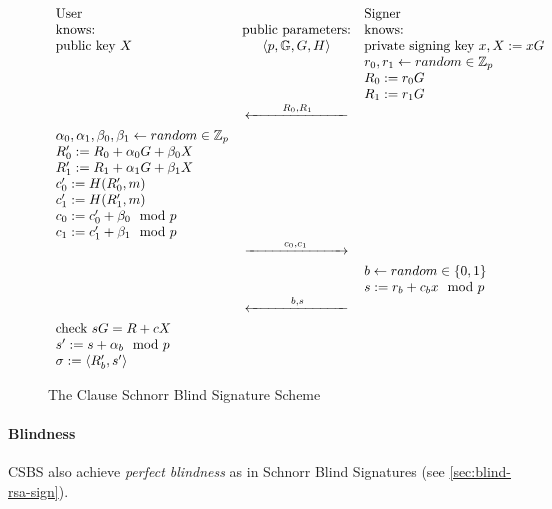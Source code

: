 \begin{figure}
    \begin{equation*}
        \begin{array}{ l c l }
            \text{User} &  & \text{Signer}
            \\ \text{knows:} & \text{public parameters:} & \text{knows:}
            \\ \text{public key } X & \langle p, \mathbb{G}, G, H\rangle & \text{private signing key } x, X := xG
            \\ & & r_0, r_1 \leftarrow random \in \mathbb{Z}_p
            \\ & & R_0 := r_0G
            \\ & & R_1 := r_1G
            \\ & \xleftarrow[\rule{2.5cm}{0pt}]{R_0, R_1} &
            \\ \alpha_0, \alpha_1, \beta_0, \beta_1 \leftarrow random \in \mathbb{Z}_p
            \\ R_0' := R_0 + \alpha_0 G + \beta_0 X
            \\ R_1' := R_1 + \alpha_1 G + \beta_1 X
            \\ c_0' := H(R_0',m)
            \\ c_1' := H(R_1',m)
            \\ c_0 := c_0' + \beta_0 \mod p
            \\ c_1 := c_1' + \beta_1 \mod p
            \\ & \xrightarrow[\rule{2.5cm}{0pt}]{c_0, c_1} &
            \\ & & b \leftarrow random \in \{ 0,1\}
            \\ & & s := r_b+c_bx \mod p
            \\ & \xleftarrow[\rule{2.5cm}{0pt}]{b, s} &
            \\ \text{check } sG = R + cX
            \\ s' := s + \alpha_b \mod p
            \\ \sigma := \langle R_b',s' \rangle
        \end{array}
    \end{equation*}
    \caption{The Clause Schnorr Blind Signature Scheme}
    \label{fig:clause-blind-schnorr-sign-scheme}
\end{figure}

\paragraph{Blindness}
\label{par:prop-blindness-cs}
\gls{CSBS} also achieve \textit{perfect blindness} as in Schnorr Blind Signatures (see \autoref{sec:blind-rsa-sign}). \cite{cryptoeprint:2019:877}


